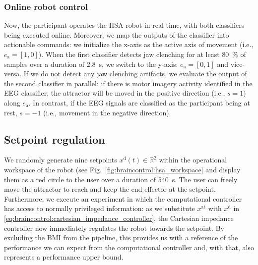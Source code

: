 \documentclass[letterpaper, 10pt, conference]{ieeeconf}      %
\begin{document}
\subsubsection{Online robot control}
Now, the participant operates the HSA robot in real time, with both classifiers being executed online.
Moreover, we map the outputs of the classifier into actionable commands: we initialize the x-axis as the active axis of movement (i.e., $e_\mathrm{a} = [1,0]$). When the first classifier detects jaw clenching for at least \SI{80}{\percent} of samples over a duration of \SI{2.8}{s}, we switch to the y-axis: $e_\mathrm{a} = [0,1]$ and vice-versa. If we do not detect any jaw clenching artifacts, we evaluate the output of the second classifier in parallel: if there is motor imagery activity identified in the \gls{EEG} classifier, the attractor will be moved in the positive direction (i.e., $s=1$) along $e_\mathrm{a}$. In contrast, if the \gls{EEG} signals are classified as the participant being at rest, $s=-1$ (i.e., movement in the negative direction).


\subsection{Setpoint regulation}\label{sub:braincontrol:experiments:setpoint_regulation}
We randomly generate nine setpoints $x^\mathrm{d}(t) \in \mathbb{R}^2$ within the operational workspace of the robot (see Fig.~\ref{fig:braincontrol:hsa_workspace} and display them as a red circle to the user over a duration of \SI{540}{s}.
The user can freely move the attractor to reach and keep the end-effector at the setpoint.
Furthermore, we execute an experiment in which the computational controller has access to normally privileged information: as we substitute $x^\mathrm{at}$ with $x^\mathrm{d}$ in \eqref{eq:braincontrol:cartesian_impedance_controller}, the Cartesian impedance controller now immediately regulates the robot towards the setpoint.
By excluding the \gls{BMI} from the pipeline, this provides us with a reference of the performance we can expect from the computational controller and, with that, also represents a performance upper bound.
\end{document}
